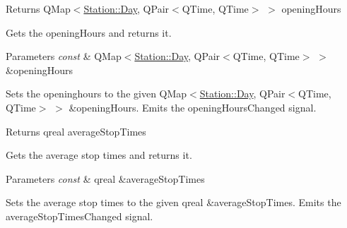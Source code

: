 \begin{DoxyReturn}{Returns}
Q\+Map$<$\mbox{\hyperlink{classCSA_1_1Station_aa160d0de40db0583099b5986dea1cd67}{Station\+::\+Day}}, Q\+Pair$<$\+Q\+Time, Q\+Time$>$ $>$ opening\+Hours
\end{DoxyReturn}
Gets the opening\+Hours and returns it.


\begin{DoxyParams}{Parameters}
{\em const} & Q\+Map$<$\mbox{\hyperlink{classCSA_1_1Station_aa160d0de40db0583099b5986dea1cd67}{Station\+::\+Day}}, Q\+Pair$<$\+Q\+Time, Q\+Time$>$ $>$ \&opening\+Hours\\
\hline
\end{DoxyParams}
Sets the openinghours to the given Q\+Map$<$\mbox{\hyperlink{classCSA_1_1Station_aa160d0de40db0583099b5986dea1cd67}{Station\+::\+Day}}, Q\+Pair$<$\+Q\+Time, Q\+Time$>$ $>$ \&opening\+Hours. Emits the opening\+Hours\+Changed signal.

\begin{DoxyReturn}{Returns}
qreal average\+Stop\+Times
\end{DoxyReturn}
Gets the average stop times and returns it.


\begin{DoxyParams}{Parameters}
{\em const} & qreal \&average\+Stop\+Times\\
\hline
\end{DoxyParams}
Sets the average stop times to the given qreal \&average\+Stop\+Times. Emits the average\+Stop\+Times\+Changed signal. 